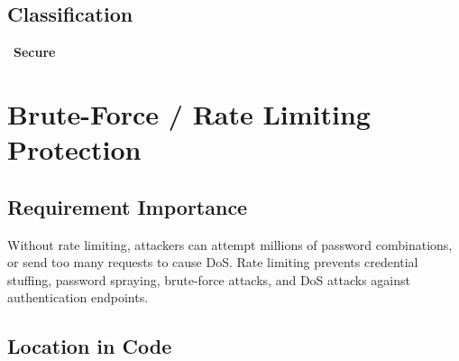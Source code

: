 \documentclass[11pt,a4paper]{article}
\newcommand{\secure}{\textcolor{securegreen}{\checkmark~\textbf{Secure}}}
\begin{document}
\subsection{Classification}
\secure

\newpage
\section{Brute-Force / Rate Limiting Protection}

\subsection{Requirement Importance}
Without rate limiting, attackers can attempt millions of password combinations, or send too many requests to cause DoS. Rate limiting prevents credential stuffing, password spraying, brute-force attacks, and DoS attacks against authentication endpoints.

\subsection{Location in Code}
\end{document}
